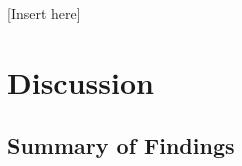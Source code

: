 \documentclass[12pt, leqno]{article}
\begin{document}
[Insert  here]







\section*{Discussion} \label{sec:discussion}

\subsection{Summary of Findings}
\end{document}
